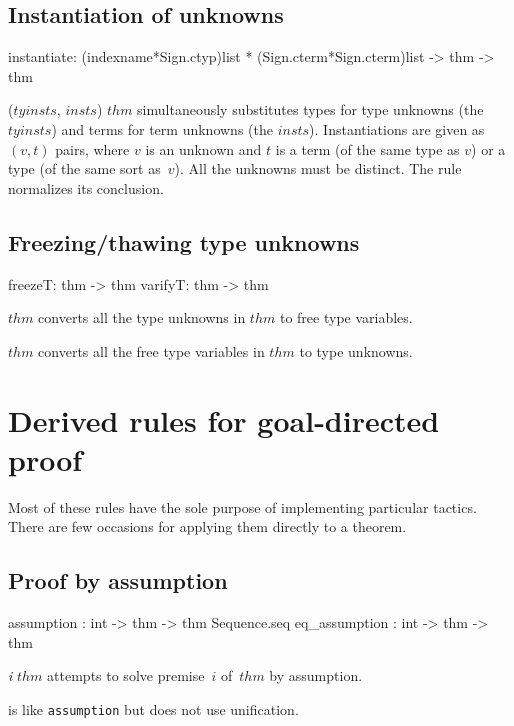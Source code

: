 \subsection{Instantiation of unknowns}
\begin{ttbox} 
instantiate: (indexname*Sign.ctyp)list * 
             (Sign.cterm*Sign.cterm)list  -> thm -> thm
\end{ttbox}
\begin{ttdescription}
\item[\ttindexbold{instantiate} ($tyinsts$, $insts$) $thm$] 
simultaneously substitutes types for type unknowns (the
$tyinsts$) and terms for term unknowns (the $insts$).  Instantiations are
given as $(v,t)$ pairs, where $v$ is an unknown and $t$ is a term (of the
same type as $v$) or a type (of the same sort as~$v$).  All the unknowns
must be distinct.  The rule normalizes its conclusion.
\end{ttdescription}


\subsection{Freezing/thawing type unknowns}
\begin{ttbox} 
freezeT: thm -> thm
varifyT: thm -> thm
\end{ttbox}
\begin{ttdescription}
\item[\ttindexbold{freezeT} $thm$] 
converts all the type unknowns in $thm$ to free type variables.

\item[\ttindexbold{varifyT} $thm$] 
converts all the free type variables in $thm$ to type unknowns.
\end{ttdescription}


\section{Derived rules for goal-directed proof}
Most of these rules have the sole purpose of implementing particular
tactics.  There are few occasions for applying them directly to a theorem.

\subsection{Proof by assumption}
\begin{ttbox} 
assumption    : int -> thm -> thm Sequence.seq
eq_assumption : int -> thm -> thm
\end{ttbox}
\begin{ttdescription}
\item[\ttindexbold{assumption} {\it i} $thm$] 
attempts to solve premise~$i$ of~$thm$ by assumption.

\item[\ttindexbold{eq_assumption}] 
is like {\tt assumption} but does not use unification.
\end{ttdescription}


